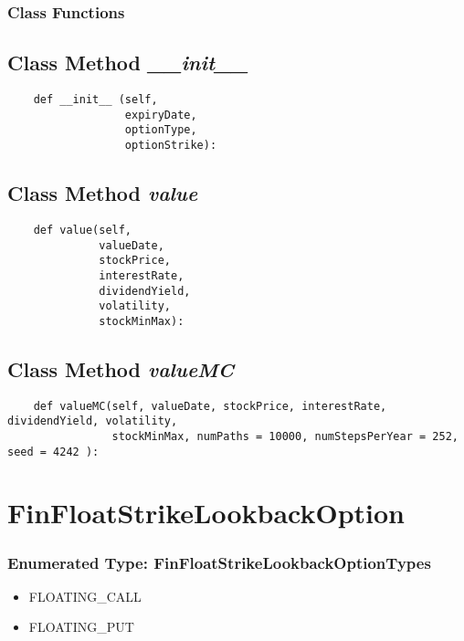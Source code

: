 \documentclass[twoside,11pt]{book}
\begin{document}
\subsubsection{Class Functions}

\subsection{Class Method {\it \_\_init\_\_ }}


\begin{lstlisting}
    def __init__ (self,
                  expiryDate,
                  optionType, 
                  optionStrike):
\end{lstlisting}

\subsection{Class Method {\it value}}


\begin{lstlisting}
    def value(self,
              valueDate,
              stockPrice,
              interestRate,
              dividendYield,
              volatility, 
              stockMinMax):
\end{lstlisting}

\subsection{Class Method {\it valueMC}}


\begin{lstlisting}
    def valueMC(self, valueDate, stockPrice, interestRate, dividendYield, volatility, 
                stockMinMax, numPaths = 10000, numStepsPerYear = 252, seed = 4242 ):
\end{lstlisting}

\newpage
\section{FinFloatStrikeLookbackOption}

\subsubsection{Enumerated Type: FinFloatStrikeLookbackOptionTypes}
\begin{itemize}
\item{FLOATING\_CALL}
\item{FLOATING\_PUT}
\end{itemize}
\end{document}
